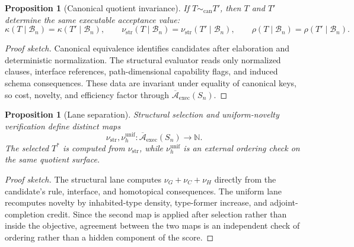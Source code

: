 \documentclass[11pt]{article}
\theoremstyle{plain}
\newtheorem{proposition}[theorem]{Proposition}
\theoremstyle{definition}
\theoremstyle{remark}
\newenvironment{proofsketch}{\begin{proof}[Proof sketch]}{\end{proof}}
\newcommand{\B}{\mathcal{B}}
\newcommand{\A}{\mathcal{A}}
\begin{document}
\begin{proposition}[Canonical quotient invariance]
If \(T\sim_{\mathrm{can}}T'\), then \(T\) and \(T'\) determine the same executable acceptance value:
\[
\kappa(T\mid\B_n)=\kappa(T'\mid\B_n),\qquad
\nu_{\mathrm{str}}(T\mid\B_n)=\nu_{\mathrm{str}}(T'\mid\B_n),\qquad
\rho(T\mid\B_n)=\rho(T'\mid\B_n).
\]
\end{proposition}

\begin{proofsketch}
Canonical equivalence identifies candidates after elaboration and deterministic normalization. The structural evaluator reads only normalized clauses, interface references, path-dimensional capability flags, and induced schema consequences. These data are invariant under equality of canonical keys, so cost, novelty, and efficiency factor through \(\overline{\A}_{\mathrm{exec}}(S_n)\).
\end{proofsketch}

\begin{proposition}[Lane separation]
Structural selection and uniform-novelty verification define distinct maps
\[
\nu_{\mathrm{str}},
\nu^{\mathrm{unif}}_h:
\overline{\A}_{\mathrm{exec}}(S_n)\to\mathbb{N}.
\]
The selected \(T^*\) is computed from \(\nu_{\mathrm{str}}\), while \(\nu^{\mathrm{unif}}_h\) is an external ordering check on the same quotient surface.
\end{proposition}

\begin{proofsketch}
The structural lane computes \(\nu_G+\nu_C+\nu_H\) directly from the candidate's rule, interface, and homotopical consequences. The uniform lane recomputes novelty by inhabited-type density, type-former increase, and adjoint-completion credit. Since the second map is applied after selection rather than inside the objective, agreement between the two maps is an independent check of ordering rather than a hidden component of the score.
\end{proofsketch}
\end{document}

